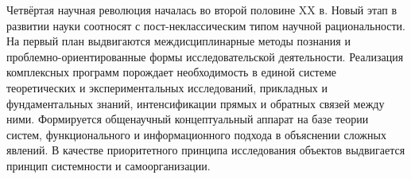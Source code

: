\documentclass[exam_answers.tex]{subfiles}
\begin{document}
Четвёртая научная революция началась во второй половине XX в.
Новый этап в развитии науки соотносят с пост-неклассическим типом научной рациональности.
На первый план выдвигаются междисциплинарные методы познания и проблемно-ориентированные формы исследовательской деятельности.
Реализация комплексных программ порождает необходимость в единой системе теоретических и экспериментальных исследований, прикладных и фундаментальных знаний, интенсификации прямых и обратных связей между ними.
Формируется общенаучный концептуальный аппарат на базе теории систем, функционального и информационного подхода в объяснении сложных явлений.
В качестве приоритетного принципа исследования объектов выдвигается принцип системности и самоорганизации.
\end{document}
